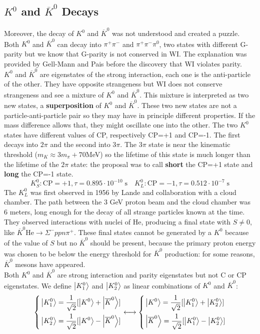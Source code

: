 \documentclass[10.75pt,a4paper,openright,bottom=2cm]{article}
\begin{document}
\subsection{$K^0$ and $\overline{K}^0$ Decays}
Moreover, the decay of $K^0$ and $\overline{K}^0$ was not understood and created a puzzle. Both $K^0$ and $\overline{K}^0$ can decay into $\pi^+\pi^-$ and $\pi^+\pi^-\pi^0$, two states with different G-parity but we know that G-parity is not conserved in WI. The explanation was provided by Gell-Mann and Pais before the discovery that WI violates parity.\\
$K^0$ and $\overline{K}^0$ are eigenstates of the strong interaction, each one is the anti-particle of the other. They have opposite strangeness but WI does not conserve strangeness and see a mixture of $K^0$ and $\overline{K}^0$. This mixture is interpreted as two new states, a \textbf{superposition} of $K^0$ and $\overline{K}^0$. These two new states are not a particle-anti-particle pair so they may have in principle different properties. If the mass difference allows that, they might oscillate one into the other. The two $K^0$ states have different values of CP, respectively CP=+1 and CP=-1. The first decays into $2\pi$ and the second into $3\pi$. The $3\pi$ state is near the kinematic threshold ($m_K\approx3m_\pi+70$\;MeV) so the lifetime of this state is much longer than the lifetime of the $2\pi$ state: the proposal was to call \textbf{short} the CP=+1 state and \textbf{long} the CP=-1 state.
\[
K_S^0: \text{CP}=+1, \tau=0.895\cdot10^{-10}\;\text{s} \quad K_L^0: \text{CP}=-1, \tau=0.512\cdot10^{-7}\;\text{s}
\]
The $K_L^0$ was first observed in 1956 by Lande and collaboration with a cloud chamber. The path between the 3 GeV proton beam and the cloud chamber was 6 meters, long enough for the decay of all strange particles known at the time. They observed interactions with nuclei of He, producing a final state with $S\neq0$, like $\overline{K}^0 \text{He}\to\Sigma^-ppn\pi^+$. These final states cannot be generated by a $K^0$ because of the value of $S$ but no $\overline{K}^0$ should be present, because the primary proton energy was chosen to be below the energy threshold for $\overline{K}^0$ production: for some reasons, $\overline{K}^0$ mesons have appeared.\\
Both $K^0$ and $\overline{K}^0$ are strong interaction and parity eigenstates but not C or CP eigenstates. We define $\ket{K_1^0}$ and $\ket{K_2^0}$ as linear combinations of $K^0$ and $\overline{K}^0$:
\[
\left\{
\begin{aligned}
&\ket{K_1^0}=\frac{1}{\sqrt{2}}[\ket{K^0}+\ket{\overline{K}^0}]\\    
&\ket{K_2^0}=\frac{1}{\sqrt{2}}[\ket{K^0}-\ket{\overline{K}^0}]
\end{aligned}
\right.
\longleftrightarrow
\left\{
\begin{aligned}
&\ket{K^0}=\frac{1}{\sqrt{2}}[\ket{K_1^0}+\ket{K_2^0}]\\ 
&\ket{\overline{K}^0}=\frac{1}{\sqrt{2}}[\ket{K_1^0}-\ket{K_2^0}]
\end{aligned}
\right.
\]
\end{document}
